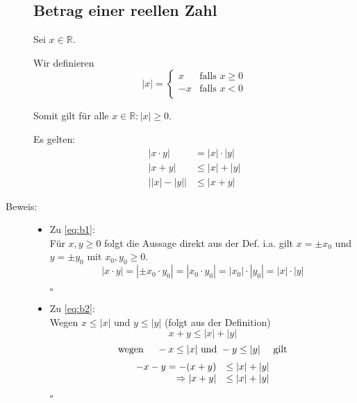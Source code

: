 \documentclass[12pt,a4paper,leqno]{article}
\begin{document}
\begin{description}
\subsection*{Betrag einer reellen Zahl}

Sei $x \in \mathbb{R}$.

Wir definieren 
\begin{equation*}
|x| = 
	\begin{cases}
		x & \textrm{falls } x \geq 0\\
		-x & \textrm{falls } x < 0\\
	\end{cases}
\end{equation*}


Somit gilt für alle $x \in \mathbb{R}: |x| \geq 0$.

Es gelten:
\renewcommand{\theequation}{B\arabic{equation}}
\setcounter{equation}{0}
\begin{align}
	\label{eq:b1} |x \cdot y| &= |x| \cdot |y| \\
	\label{eq:b2} |x+y| &\leq |x|+|y| \\	
	\label{eq:b3} \big||x|-|y|\big| &\leq |x+y|
\end{align}

\item[Beweis:] \hfill

\begin{itemize}
\item[] Zu \eqref{eq:b1}: \\
	 Für $x, y \geq 0$ folgt die Aussage direkt aus der Def. i.a. gilt $x = \pm x_0$ und $y = \pm y_0$ mit $x_0, y_0 \geq 0$.
	 $$|x\cdot y| =  |\pm x_0\cdot y_0 | = |x_0 \cdot y_0| = |x_0|\cdot|y_0|=|x|\cdot|y|$$
	 \begin{flushright}$\square$\end{flushright}

\item[] Zu \eqref{eq:b2}: \\
	Wegen $ x \leq |x|$ und $y \leq |y|$ (folgt aus der Definition)
	$$x + y \leq |x| + |y|$$
	$$\textrm{wegen } \quad -x \leq |x| \\ \textrm{ und } -y \leq |y| \quad \textrm{ gilt}$$
	$$\begin{array}{r l}
		   -x - y = -(x+y)  &\leq |x| + |y| \\
		\Rightarrow |x + y| &\leq |x| + |y|	
	\end{array}$$
	 \begin{flushright}$\square$\end{flushright}



\end{itemize}
\end{description}
\end{document}
